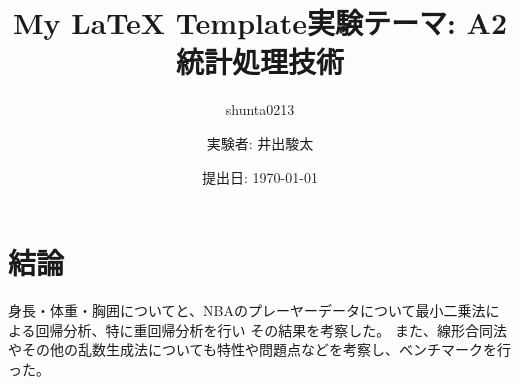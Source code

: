 \documentclass{jlreq}
\title{My {\LaTeX} Template}
\author{shunta0213}
\title{実験テーマ: A2 統計処理技術}
\author{実験者: 井出駿太 }
\date{提出日: \today}
\begin{document}
\maketitle



\clearpage

% 
\clearpage

\clearpage


\clearpage
\section{結論}
身長・体重・胸囲についてと、NBAのプレーヤーデータについて最小二乗法による回帰分析、特に重回帰分析を行い
その結果を考察した。
また、線形合同法やその他の乱数生成法についても特性や問題点などを考察し、ベンチマークを行った。


\clearpage


\clearpage
\printbibliography
\end{document}
